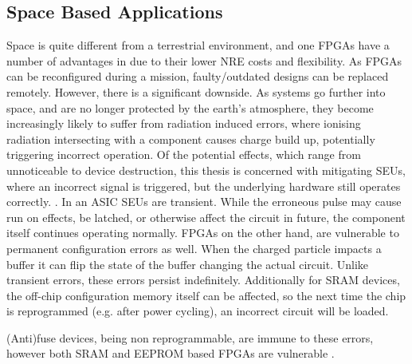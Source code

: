 \documentclass[12pt,drafta4paper,oneside]{memoir} %
\begin{document}
\subsection{Space Based Applications}
Space is quite different from a terrestrial environment, and one \acp{FPGA} have a number of advantages in due to their lower \ac{NRE} costs and flexibility. As \acp{FPGA} can be reconfigured during a mission, faulty/outdated designs can be replaced remotely. However, there is a significant downside. As systems go further into space, and are no longer protected by the earth's atmosphere, they become increasingly likely to suffer from radiation induced errors, where ionising radiation intersecting with a component causes charge build up, potentially triggering incorrect operation\cite{SEEMechanism}. Of the potential effects, which range from unnoticeable to device destruction, this thesis is concerned with mitigating \acp{SEU}, where an incorrect signal is triggered, but the underlying hardware still operates correctly. . In an \ac{ASIC} \acp{SEU} are transient. While the erroneous pulse may cause run on effects, be latched, or otherwise affect the circuit in future, the component itself continues operating normally.
\acp{FPGA} on the other hand, are vulnerable to permanent configuration errors as well. When the charged particle impacts a buffer it can flip the state of the buffer changing the actual circuit. Unlike transient errors, these errors persist indefinitely. 
Additionally for \ac{SRAM} devices, the off-chip configuration memory itself can be affected, so the next time the chip is reprogrammed (e.g. after power cycling), an incorrect circuit will be loaded.

(Anti)fuse devices, being non reprogrammable, are immune to these errors, however both \ac{SRAM} and \ac{EEPROM} based \acp{FPGA} are vulnerable .
\end{document}
